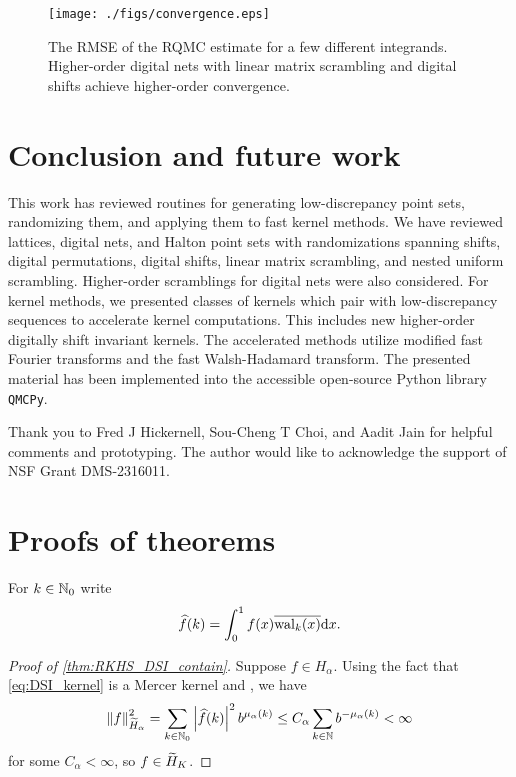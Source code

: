 \documentclass[acmsmall]{acmart}
\begin{document}
\begin{figure}%
    \centering
    \texttt{[image: ./figs/convergence.eps]}
    \caption{The RMSE of the RQMC estimate for a few different integrands. Higher-order digital nets with linear matrix scrambling and digital shifts achieve higher-order convergence.}
    \Description[]{}
    \label{fig:convergence}
\end{figure}

\section{Conclusion and future work} \label{sec:conclusions_future_work}

This work has reviewed routines for generating low-discrepancy point sets, randomizing them, and applying them to fast kernel methods. We have reviewed lattices, digital nets, and Halton point sets with randomizations spanning shifts, digital permutations, digital shifts, linear matrix scrambling, and nested uniform scrambling. Higher-order scramblings for digital nets were also considered. For kernel methods, we presented classes of kernels which pair with low-discrepancy sequences to accelerate kernel computations. This includes new higher-order digitally shift invariant kernels. The accelerated methods utilize modified fast Fourier transforms and the fast Walsh-Hadamard transform. The presented material has been implemented into the accessible open-source Python library \texttt{QMCPy}.  

\begin{acks}
    Thank you to Fred J Hickernell, Sou-Cheng T Choi, and Aadit Jain for helpful comments and prototyping. The author would like to acknowledge the support of NSF Grant DMS-2316011.
\end{acks}

%




\appendix 

\section{Proofs of theorems} \label{appendix:proofs}

For $k \in {\mathbb{N}}_0$ write
$${\widehat{f}}(k) = \int_0^1 f(x) \overline{\mathrm{wal}_k(x)} \mathrm{d} x.$$

\begin{proof}[Proof of \cref{thm:RKHS_DSI_contain}] 
    Suppose $f \in H_\alpha$. Using the fact that \eqref{eq:DSI_kernel} is a Mercer kernel and \citep[Theorem 14, Remark 19]{dick.decay_walsh_coefficients_smooth_functions}, we have 
    $$\left\lVert f \right\rVert_{{\widetilde{H}}_\alpha}^2 = \sum_{k \in {\mathbb{N}}_0} \left\lvert {\widehat{f}}(k) \right\rvert^2 b^{\mu_\alpha(k)} \leq C_\alpha \sum_{k \in {\mathbb{N}}} b^{-\mu_\alpha(k)} < \infty$$ 
    for some $C_\alpha < \infty$, so $f \in {\widetilde{H}}_K$.
\end{proof}
\end{document}
